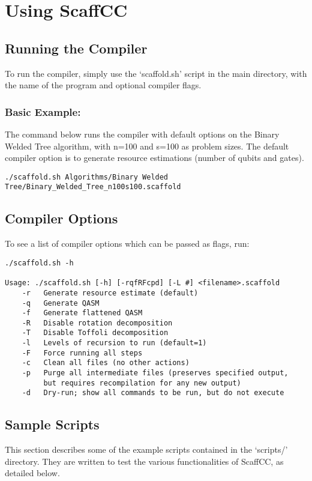 \chapter{Using ScaffCC}\label{ch:usage}

\section{Running the Compiler}
To run the compiler, simply use the `scaffold.sh' script in the main directory, with the name of the program and optional compiler flags.

\subsection{Basic Example:}

The command below runs the compiler with default options on the Binary Welded Tree algorithm, with n=100 and s=100 as problem sizes.
The default compiler option is to generate resource estimations (number of qubits and gates).

\begin{lstlisting}
./scaffold.sh Algorithms/Binary Welded Tree/Binary_Welded_Tree_n100s100.scaffold
\end{lstlisting}


\section{Compiler Options}
To see a list of compiler options which can be passed as flags, run:

\begin{lstlisting}
./scaffold.sh -h

Usage: ./scaffold.sh [-h] [-rqfRFcpd] [-L #] <filename>.scaffold
    -r   Generate resource estimate (default)
    -q   Generate QASM
    -f   Generate flattened QASM
    -R   Disable rotation decomposition
    -T   Disable Toffoli decomposition
    -l   Levels of recursion to run (default=1)
    -F   Force running all steps
    -c   Clean all files (no other actions)
    -p   Purge all intermediate files (preserves specified output,
         but requires recompilation for any new output)
    -d   Dry-run; show all commands to be run, but do not execute
\end{lstlisting}



\section{Sample Scripts}
This section describes some of the example scripts contained in the `scripts/' directory. They are written to test the various functionalities 
of ScaffCC, as detailed below.

